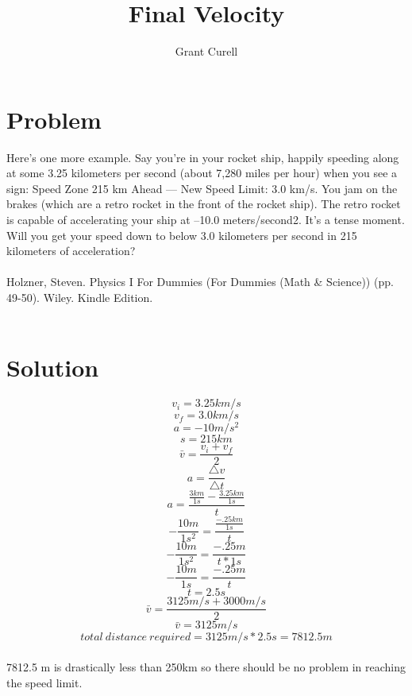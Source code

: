 \documentclass{article}
\title{Final Velocity}
\author{Grant Curell}
\begin{document}
\maketitle{}
\section{Problem}
Here’s one more example. Say you’re in your rocket ship, happily speeding along at some 3.25 kilometers per second (about 7,280 miles per hour) when you see a sign: Speed Zone 215 km Ahead — New Speed Limit: 3.0 km/s. You jam on the brakes (which are a retro rocket in the front of the rocket ship). The retro rocket is capable of accelerating your ship at –10.0 meters/second2. It’s a tense moment. Will you get your speed down to below 3.0 kilometers per second in 215 kilometers of acceleration?
\\\\
Holzner, Steven. Physics I For Dummies (For Dummies (Math \& Science)) (pp. 49-50). Wiley. Kindle Edition.
\\\\
\section{Solution}
\[ v_i=3.25km/s \]
\[ v_f=3.0km/s \]
\[ a=-10m/s^2 \]
\[ s=215km \]
\[ \bar{v}=\frac{v_i+v_f}{2} \]
\[ a=\frac{\triangle{v}}{\triangle{t}} \]
\[ a=\frac{\frac{3km}{1s}-\frac{3.25km}{1s}}{t} \]
\[-\frac{10m}{1s^2}=\frac{\frac{-.25km}{1s}}{t} \]
\[-\frac{10m}{1s^2}=\frac{-.25m}{t*1s} \]
\[-\frac{10m}{1s}=\frac{-.25m}{t} \]
\[t=2.5s\]
\[ \bar{v}=\frac{3125m/s+3000m/s}{2} \]
\[ \bar{v}=3125m/s \]
\[ total\ distance\ required = 3125m/s * 2.5s = 7812.5m \]
\\
7812.5 m is drastically less than 250km so there should be no problem in reaching the speed limit.
\end{document}
